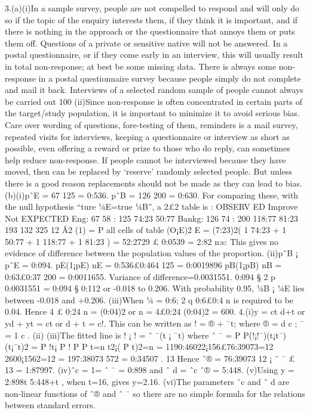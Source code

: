 3.(a)(i)In a sample survey, people are not compelled to respond and will only do so if the topic of
the enquiry interests them, if they think it is important, and if there is nothing in the approach
or the questionnaire that annoys them or puts them off. Questions of a private or sensitive native
will not be answered. In a postal questionnaire, or if they come early in an interview, this will
usually result in total non-response; at best be some missing data.
There is always some non-response in a postal questionnaire survey because people simply do
not complete and mail it back. Interviews of a selected random sample of people cannot always be
carried out 100%
(ii)Since non-response is often concentrated in certain parts of the target/study population, it is
important to minimize it to avoid serious bias.
Care over wording of questions, fore-testing of them, reminders is a mail survey, repeated visits
for interviews, keeping a questionnaire or interview as short as possible, even offering a reward or
prize to those who do reply, can sometimes help reduce non-response.
If people cannot be interviewed because they have moved, then can be replaced by ‘reserve’
randomly selected people. But unless there is a good reason replacements should not be made as
they can lead to bias.
(b)(i)pˆE = 67
125 = 0:536. pˆB = 126
200 = 0:630. For comparing these, with the null hypothesis
“ture ¼E=true ¼B”, a 2£2 table is :
OBSERV ED Improve Not EXPECTED
Eng: 67 58 : 125 74:23 50:77
Bankg: 126 74 : 200 118:77 81:23
193 132 325
12
Â2
(1) =
P
all cells of table
(O¡E)2
E = (7:23)2( 1
74:23 + 1
50:77 + 1
118:77 + 1
81:23 )
= 52:2729 £ 0:0539
= 2:82 n:s:
This gives no evidence of difference between the population values of the proportion.
(ii)pˆB ¡ pˆE = 0:094. pE(1¡pE)
nE
= 0:536£0:464
125 = 0:0019896
pB(1¡pB)
nB
= 0:63£0:37
200 = 0:0011655. Variance of difference=0.0031551.
0:094 § 2
p
0:0031551 = 0:094 § 0:112 or -0.018 to 0.206.
With probability 0.95, ¼B ¡ ¼E lies between -0.018 and +0.206.
(iii)When ¼ = 0:6; 2
q
0:6£0:4
n is required to be 0.04.
Hence 4 £ 0:24
n = (0:04)2 or n = 4£0:24
(0:04)2 = 600.
4.(i)y = ct
d+t or yd + yt = ct or d + t = c!.
This can be written as ! = ® + ¯t; where ® = d
c ; ¯ = 1
c .
(ii)
(iii)The fitted line is ! ¡ ! = ˆ ¯(t ¡ ¯t) where
ˆ ¯ =
P
P(!¡!¯)(t¡t¯)
(t¡¯t)2 =
P
!t¡
P
!
P
P t=n
t2¡(
P
t)2=n
= 1190:46022¡156£76:39073=12
2600¡1562=12
= 197:38073
572 = 0:34507
.
13
Hence ˆ® = 76:39073
12 ¡ ˆ ¯ £ 13 = 1:87997.
(iv)ˆc = 1= ˆ ¯ = 0:898 and ˆ d = ˆc ˆ® = 5:448.
(v)Using y = 2:898t
5:448+t , when t=16, gives y=2.16.
(vi)The parameters ˆc and ˆ d are non-linear functions of ˆ® and ˆ ¯ so there are no simple formula
for the relations between standard errors.
